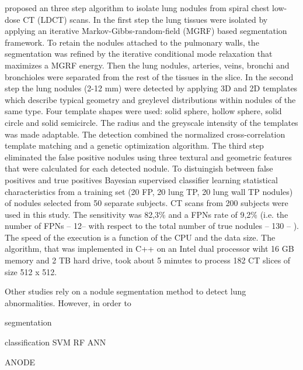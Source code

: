 \cite{elbaz} proposed an three step algorithm to isolate lung nodules from
spiral chest low-dose CT (LDCT) scans. In the first step the lung tissues were
isolated by applying an iterative Markov-Gibbs-random-field (MGRF) based
segmentation framework. To retain the nodules attached to the pulmonary walls, the
segmentation was refined by the iterative conditional mode relaxation that
maximizes a MGRF energy. Then the lung nodules, arteries, veins, bronchi and
bronchioles were separated from the rest of the tissues in the slice. In the
second step the lung nodules (2-12 mm) were detected by applying 3D and 2D
templates which describe typical geometry and greylevel distributions within
nodules of the same type. Four template shapes were used: solid sphere, hollow
sphere, solid circle and solid semicircle. The radius and the greyscale
intensity of the templates was made adaptable. The detection combined the
normalized cross-correlation template matching and a genetic optimization
algorithm. The third step eliminated the false positive nodules using three
textural and geometric features that were calculated for each detected nodule.
To distuingish between false positives and true positives Bayesian supervised
classifier learning statistical characteristics from a training set (20 FP, 20
lung TP, 20 lung wall TP nodules) of nodules selected from 50 separate subjects.
CT scans from 200 subjects were used in this study. The sensitivity was 82,3\%
and a FPNs rate of 9,2\% (i.e. the number of FPNs -- 12-- with respect to the
total number of true nodules -- 130 -- ). The speed of the execution is a
function of the CPU and the data size. The algorithm, that was implemented in
C++ on an Intel dual processor wiht 16 GB memory and 2 TB hard drive, took about
5 minutes to process 182 CT slices of size 512 x 512.

Other studies rely on a nodule segmentation method to detect lung abnormalities.
However, in order to 

segmentation

classification
	SVM
	RF
	ANN
	
ANODE

